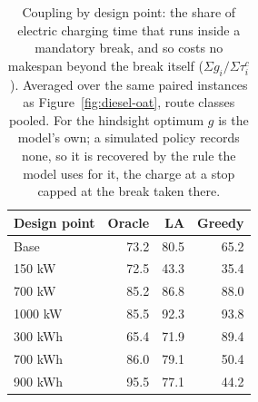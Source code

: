 \begin{table}[ht]\centering
\caption{Coupling by design point: the share of electric charging time that runs inside a mandatory break, and so costs no makespan beyond the break itself ($\Sigma g_i / \Sigma \tau^c_i$).  Averaged over the same paired instances as Figure~\ref{fig:diesel-oat}, route classes pooled.  For the hindsight optimum $g$ is the model's own; a simulated policy records none, so it is recovered by the rule the model uses for it, the charge at a stop capped at the break taken there.}
\label{tab:diesel-oat-coupling}
\begin{tabular}{lrrr}
\hline
Design point & Oracle & LA & Greedy \\
\hline
Base & 73.2 & 80.5 & 65.2 \\
150 kW & 72.5 & 43.3 & 35.4 \\
700 kW & 85.2 & 86.8 & 88.0 \\
1000 kW & 85.5 & 92.3 & 93.8 \\
300 kWh & 65.4 & 71.9 & 89.4 \\
700 kWh & 86.0 & 79.1 & 50.4 \\
900 kWh & 95.5 & 77.1 & 44.2 \\
\hline
\end{tabular}
\end{table}
